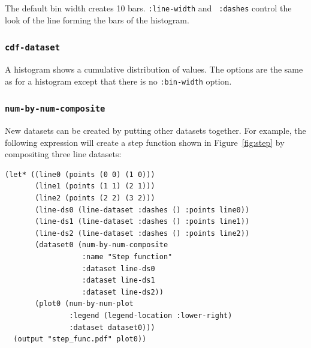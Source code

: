 \documentclass{article}
\begin{document}
The default bin width creates 10 bars.  {\tt :line-width} and {\tt
  :dashes} control the look of the line forming the bars of the
histogram.

\subsubsection{\tt cdf-dataset}

A histogram shows a cumulative distribution of values.
The options are the same as for a histogram except that there is no
{\tt :bin-width} option.

\subsubsection{\tt num-by-num-composite}

New datasets can be created by putting other datasets together.  For
example, the following expression will create a step function shown in
Figure~\ref{fig:step} by compositing three line datasets:

\begin{verbatim}
(let* ((line0 (points (0 0) (1 0)))
       (line1 (points (1 1) (2 1)))
       (line2 (points (2 2) (3 2)))
       (line-ds0 (line-dataset :dashes () :points line0))
       (line-ds1 (line-dataset :dashes () :points line1))
       (line-ds2 (line-dataset :dashes () :points line2))
       (dataset0 (num-by-num-composite
                  :name "Step function"
                  :dataset line-ds0
                  :dataset line-ds1
                  :dataset line-ds2))
       (plot0 (num-by-num-plot
               :legend (legend-location :lower-right)
               :dataset dataset0)))
  (output "step_func.pdf" plot0))
\end{verbatim}
\end{document}
